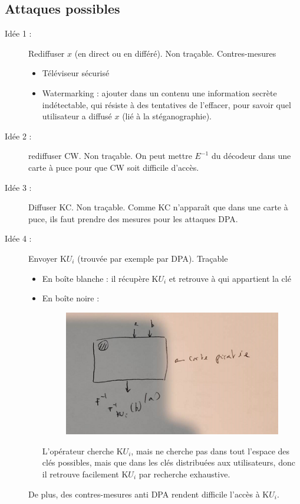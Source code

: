        \subsection{Attaques possibles}
            \begin{description}
                \item[Idée 1 :] Rediffuser $x$ (en direct ou en différé). Non traçable. Contres-mesures
                \begin{itemize}
                    \item Téléviseur sécurisé
                    \item Watermarking : ajouter dans un contenu une information secrète indétectable, qui résiste à des tentatives de l'effacer, pour savoir quel utilisateur a diffusé $x$ (lié à la stéganographie).
                \end{itemize}
                \item[Idée 2 :] rediffuser CW. Non traçable. On peut mettre $E^{-1}$ du décodeur dans une carte à puce pour que CW soit difficile d'accès. 
                \item[Idée 3 :] Diffuser KC. Non traçable. Comme KC n'apparaît que dans une carte à puce, ils faut prendre des mesures pour les attaques DPA.
                \item[Idée 4 :] Envoyer K$U_i$ (trouvée par exemple par DPA). Traçable
                \begin{itemize}
                    \item En boîte blanche : il récupère K$U_i$ et retrouve à qui appartient la clé
                    \item En boîte noire :
                    \begin{figure}[H]
                        \centering
                        \includegraphics[width=.5\textwidth]{pictures/2_5}
                    \end{figure} \noindent
                    L'opérateur cherche K$U_i$, mais ne cherche pas dans tout l'espace des clés possibles, mais que dans les clés distribuées aux utilisateurs, donc il retrouve facilement K$U_i$ par recherche exhaustive. 
                \end{itemize}
                De plus, des contres-mesures anti DPA rendent difficile l'accès à K$U_i$.
            \end{description}

